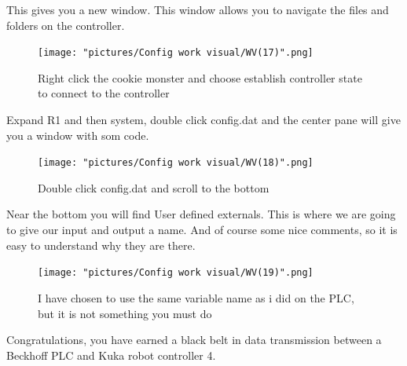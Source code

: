 \documentclass{article}
\begin{document}
\newpage

This gives you a new window. This window allows you to navigate the files and folders on the controller. 

\begin{figure}[!h]
    \centering
    \texttt{[image: "pictures/Config work visual/WV(17)".png]}
    \caption{Right click the cookie monster and choose establish controller state to connect to the controller}
    \label{fig:my_label}
\end{figure}

\newpage

Expand R1 and then system, double click config.dat and the center pane will give you a window with som code.

\begin{figure}[!h]
    \centering
    \texttt{[image: "pictures/Config work visual/WV(18)".png]}
    \caption{Double click config.dat and scroll to the bottom}
    \label{fig:my_label}
\end{figure}

Near the bottom you will find User defined externals. This is where we are going to give our input and output a name. And of course some nice comments, so it is easy to understand why they are there. 

\newpage

\begin{figure}[!h]
    \centering
    \texttt{[image: "pictures/Config work visual/WV(19)".png]}
    \caption{I have chosen to use the same variable name as i did on the PLC, but it is not something you must do}
    \label{fig:my_label}
\end{figure}

Congratulations, you have earned a black belt in data transmission between a Beckhoff PLC and Kuka robot controller 4.  
\end{document}
